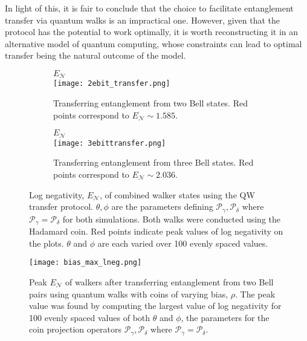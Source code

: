 In light of this, it is fair to conclude that the choice to facilitate entanglement transfer via quantum walks is an impractical one.
However, given that the protocol has the potential to work optimally, it is worth reconstructing it in an alternative model of quantum computing, whose constraints can lead to optimal transfer being the natural outcome of the model.
\begin{figure}[h]
    \centering
    \begin{subfigure}{0.49\textwidth}
        \centering
        $E_\mathcal{N}$\\
        \texttt{[image: 2ebit\_transfer.png]}
        \caption{Transferring entanglement from two Bell states. Red points correspond to $E_\mathcal{N}\sim 1.585$.}
        \label{fig:2ebittransfer}
    \end{subfigure}
    \hfill
    \begin{subfigure}{0.49\textwidth}
        \centering
        $E_\mathcal{N}$\\
        \texttt{[image: 3ebittransfer.png]}
        \caption{Transferring entanglement from three Bell states. Red points correspond to $E_\mathcal{N}\sim 2.036$.}
        \label{fig:3ebittransfer}
    \end{subfigure}
    \caption{Log negativity, $E_\mathcal{N}$, of combined walker states using the QW transfer protocol. $\theta, \phi$ are the parameters defining $\mathcal{P}_\gamma,\mathcal{P}_\delta$ where $\mathcal{P}_\gamma = \mathcal{P}_\delta$ for both simulations. Both walks were conducted using the Hadamard coin. Red points indicate peak values of log negativity on the plots. $\theta$ and $\phi$ are each varied over 100 evenly spaced values.}
    \label{fig:lneg_transfer}
\end{figure}

\begin{figure}[h!]
    \centering
    \texttt{[image: bias\_max\_lneg.png]}
    \caption{Peak $E_\mathcal{N}$ of walkers after transferring entanglement from two Bell pairs using quantum walks with coins of varying bias, $\rho$. The peak value was found by computing the largest value of log negativity for 100 evenly spaced values of both $\theta$ and $\phi$, the parameters for the coin projection operators $\mathcal{P}_{\gamma}, \mathcal{P}_\delta$ where $\mathcal{P}_{\gamma} = \mathcal{P}_\delta$.}
    \label{fig:bias_lneg}
\end{figure}